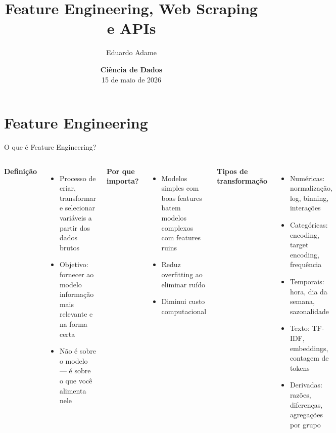 \documentclass[xcolor=dvipsnames,t,aspectratio=169]{beamer}
\title{Feature Engineering, Web Scraping e APIs}
\author{Eduardo Adame}
\date{{\color{nes_dark_purple}\textbf{Ciência de Dados}\\[0.5em] 15 de maio de 2026 }}
\newcommand{\highlight}[1]{{\color{nes_dark_orange} #1}}
\begin{document}
\frame[plain]{\titlepage}
\setcounter{framenumber}{0}


\section{Feature Engineering}

\begin{frame}[c]{O que é Feature Engineering?}

\begin{columns}
\textbf{\color{nes_dark_purple}Definição}
\begin{itemize}
    \item Processo de \highlight{criar, transformar e selecionar} variáveis a partir dos dados brutos
    \item Objetivo: fornecer ao modelo informação mais relevante e na forma certa
    \item Não é sobre o modelo — é sobre \highlight{o que você alimenta} nele
\end{itemize}

\textbf{\color{nes_dark_purple}Por que importa?}
\begin{itemize}
    \item Modelos simples com boas features batem modelos complexos com features ruins
    \item Reduz overfitting ao eliminar ruído
    \item Diminui custo computacional
\end{itemize}

\textbf{\color{nes_dark_purple}Tipos de transformação}
\begin{itemize}
    \item \highlight{Numéricas}: normalização, log, binning, interações
    \item \highlight{Categóricas}: encoding, target encoding, frequência
    \item \highlight{Temporais}: hora, dia da semana, sazonalidade
    \item \highlight{Texto}: TF-IDF, embeddings, contagem de tokens
    \item \highlight{Derivadas}: razões, diferenças, agregações por grupo
\end{itemize}
\end{columns}

\end{frame}
\end{document}

